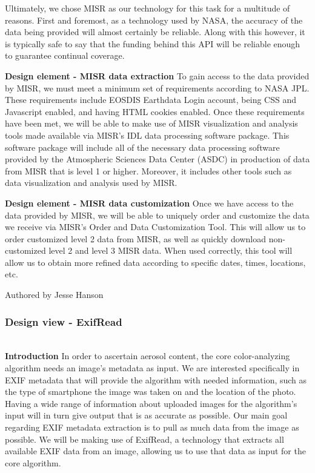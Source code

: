 \documentclass[onecolumn, draftclsnofoot,10pt, compsoc]{IEEEtran}
\begin{document}
\begin{flushleft}
\medskip

Ultimately, we chose MISR as our technology for this task for a multitude of reasons. First and foremost, as a technology used by NASA, the accuracy of the data being provided will almost certainly be reliable. Along with this however, it is typically safe to say that the funding behind this API will be reliable enough to guarantee continual coverage.

\medskip

\textbf{Design element - MISR data extraction}
To gain access to the data provided by MISR, we must meet a minimum set of requirements according to NASA JPL. These requirements include EOSDIS Earthdata Login account, being CSS and Javascript enabled, and having HTML cookies enabled.
Once these requirements have been met, we will be able to make use of MISR visualization and analysis tools made available via MISR’s IDL data processing software package. This software package will include all of the necessary data processing software provided by the Atmospheric Sciences Data Center (ASDC) in production of data from MISR that is level 1 or higher. Moreover, it includes other tools such as data visualization and analysis used by MISR. \cite{24} 

\medskip

\textbf{Design element - MISR data customization}
Once we have access to the data provided by MISR, we will be able to uniquely order and customize the data we receive via MISR’s Order and Data Customization Tool. \cite{25} This will allow us to order customized level 2 data from MISR, as well as quickly download non-customized level 2 and level 3 MISR data. When used correctly, this tool will allow us to obtain more refined data according to specific dates, times, locations, etc.

\smallskip

\footnotesize Authored by Jesse Hanson
\normalsize

\bigskip



\subsubsection{Design view - ExifRead} \ \\
\textbf{Introduction} In order to ascertain aerosol content, the core color-analyzing algorithm needs an image's metadata as input. We are interested specifically in EXIF metadata that will provide the algorithm with needed information, such as the type of smartphone the image was taken on and the location of the photo. Having a wide range of information about uploaded images for the algorithm's input will in turn give output that is as accurate as possible. Our main goal regarding EXIF metadata extraction is to pull as much data from the image as possible. We will be making use of ExifRead, a technology that extracts all available EXIF data from an image, allowing us to use that data as input for the core algorithm. 



\end{flushleft}
\end{document}

